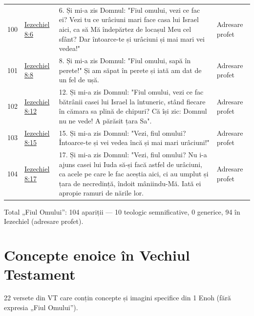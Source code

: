 \documentclass[12pt,a4paper,twoside,openany]{book}
\begin{document}
\begin{longtable}{L{0.8cm}L{1.2cm}L{11.9cm}L{0.8cm}}
100 & \href{https://bibliaortodoxa.ro/carte.php?id=33\&cap=8\#6}{Iezechiel 8:6} & 6. Și mi-a zis Domnul: "Fiul omului, vezi ce fac ei? Vezi tu ce urâciuni mari face casa lui Israel aici, ca să Mă îndepărtez de locașul Meu cel sfânt? Dar întoarce-te și urâciuni și mai mari vei vedea!" & Adresare profet \\
101 & \href{https://bibliaortodoxa.ro/carte.php?id=33\&cap=8\#8}{Iezechiel 8:8} & 8. Și mi-a zis Domnul: "Fiul omului, sapă în perete!" Și am săpat în perete și iată am dat de un fel de ușă. & Adresare profet \\
102 & \href{https://bibliaortodoxa.ro/carte.php?id=33\&cap=8\#12}{Iezechiel 8:12} & 12. Și mi-a zis Domnul: "Fiul omului, vezi ce fac bătrânii casei lui Israel la întuneric, stând fiecare în cămara sa plină de chipuri? Că își zic: Domnul nu ne vede! A părăsit țara Sa". & Adresare profet \\
103 & \href{https://bibliaortodoxa.ro/carte.php?id=33\&cap=8\#15}{Iezechiel 8:15} & 15. Și mi-a zis Domnul: "Vezi, fiul omului? Întoarce-te și vei vedea încă și mai mari urâciuni!" & Adresare profet \\
104 & \href{https://bibliaortodoxa.ro/carte.php?id=33\&cap=8\#17}{Iezechiel 8:17} & 17. Și mi-a zis Domnul: "Vezi, fiul omului? Nu i-a ajuns casei lui Iuda să-și facă astfel de urâciuni, ca acele pe care le fac aceștia aici, ci au umplut și țara de necredință, îndoit mâniindu-Mă. Iată ei apropie ramuri de nările lor. & Adresare profet \\
\bottomrule
\end{longtable}
\normalsize
Total „Fiul Omului”: 104 apariții — 10 teologic semnificative, 0 generice, 94 în Iezechiel (adresare profet).


\chapter{Concepte enoice în Vechiul Testament}\label{vt-enoh}
22 versete din VT care conțin concepte și imagini specifice din 1 Enoh (fără expresia „Fiul Omului”).
\end{document}
